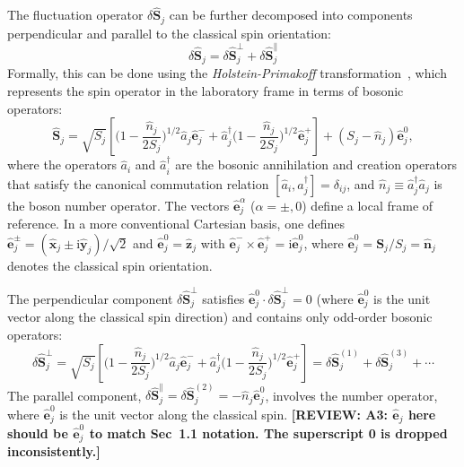 \documentclass[aps, prx, nofootinbib, superscriptaddress]{revtex4-2}
\newcommand{\REVIEW}[1]{{\color{reviewcolor}\bfseries [REVIEW: #1]}}
\newcommand{\ri}{\mathrm{i}}
\begin{document}
The fluctuation operator $\delta \hat{\mathbf{S}}_{j}$ can be further decomposed into components perpendicular and parallel to the classical spin orientation:
\begin{equation}
    \delta \hat{\mathbf{S}}_{j} = \delta \hat{\mathbf{S}}_{j}^{\perp} + \delta \hat{\mathbf{S}}_{j}^{\parallel} 
\end{equation}
Formally, this can be done using the \emph{Holstein-Primakoff} transformation~\cite{PhysRev.58.1098}, which represents the spin operator in the laboratory frame in terms of bosonic operators:
\begin{equation}
    \hat{\mathbf{S}}_{j} 
    = \sqrt{S_{j}} 
    \left[ 
    \Big( 1 - \frac{\hat{n}_{j}}{2S_{j}} \Big)^{1/2} \hat{a}_{j} \hat{\mathbf{e}}_{j}^{-} + 
    \hat{a}_{j}^{\dagger} \Big( 1 - \frac{\hat{n}_{j}}{2S_{j}} \Big)^{1/2} \hat{\mathbf{e}}_{j}^{+}
    \right]
    + (S_{j} - \hat{n}_{j}) \hat{\mathbf{e}}_{j}^{0},
\end{equation}
where the operators $\hat{a}_{i}$ and $\hat{a}_{i}^{\dagger}$ are the bosonic annihilation and creation operators that satisfy the canonical commutation relation $[\hat{a}_{i}, \hat{a}_{j}^{\dagger}] = \delta_{ij}$, and $\hat{n}_{j} \equiv \hat{a}^{\dagger}_{j} \hat{a}_{j}$ is the boson number operator. 
The vectors $\hat{\mathbf{e}}_{j}^{\alpha}$ ($\alpha = \pm, 0$) define a local frame of reference. In a more conventional Cartesian basis, one defines $\hat{\mathbf{e}}_{j}^{\pm} = (\hat{\mathbf{x}}_{j} \pm \ri \hat{\mathbf{y}}_{j})/\sqrt{2}$ and $\hat{\mathbf{e}}_{j}^{0} = \hat{\mathbf{z}}_{j}$ with $\hat{\mathbf{e}}_{j}^{-} \times \hat{\mathbf{e}}_{j}^{+} = \ri \hat{\mathbf{e}}_{j}^{0}$, where $\hat{\mathbf{e}}^{0}_{j} = \mathbf{S}_{j} / {S_{j}} = \hat{\mathbf{n}}_{j}$ denotes the classical spin orientation.

The perpendicular component $ \delta \hat{\mathbf{S}}_{j}^{\perp}$ satisfies $ \hat{\mathbf{e}}_{j}^{0} \cdot \delta \hat{\mathbf{S}}_{j}^{\perp} = 0 $ (where $\hat{\mathbf{e}}_{j}^{0}$ is the unit vector along the classical spin direction) and contains only odd-order bosonic operators: 
\begin{equation}
    \delta \hat{\mathbf{S}}_{j}^{\perp} = \sqrt{S_{j}}\left[ 
    \Big( 1 - \frac{\hat{n}_{j}}{2S_{j}} \Big)^{1/2} \hat{a}_{j} \hat{\mathbf{e}}_{j}^{-} + 
    \hat{a}_{j}^{\dagger} \Big( 1 - \frac{\hat{n}_{j}}{2S_{j}} \Big)^{1/2} \hat{\mathbf{e}}_{j}^{+}
    \right] 
    = \delta \hat{\mathbf{S}}_{j}^{(1)} + \delta \hat{\mathbf{S}}_{j}^{(3)} + \cdots 
\end{equation}
The parallel component, $\delta \hat{\mathbf{S}}_{j}^{\parallel} = \delta \hat{\mathbf{S}}_{j}^{(2)} = -\hat{n}_{j} \hat{\mathbf{e}}_{j}^{0}$, involves the number operator, where $\hat{\mathbf{e}}_{j}^{0}$ is the unit vector along the classical spin.
\REVIEW{A3: $\hat{\mathbf{e}}_{j}$ here should be $\hat{\mathbf{e}}_{j}^{0}$ to match Sec~1.1 notation. The superscript 0 is dropped inconsistently.}
\end{document}
